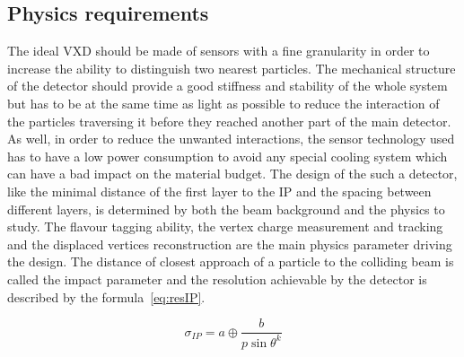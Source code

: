    \subsection{Physics requirements}

   The ideal \gls{VXD} should be made of sensors with a fine granularity in order to increase the ability to distinguish two nearest particles.
   The mechanical structure of the detector should provide a good stiffness and stability of the whole system but has to be at the same time as light as possible to reduce the interaction of the particles traversing it before they reached another part of the main detector.
   As well, in order to reduce the unwanted interactions, the sensor technology used has to have a low power consumption to avoid any special cooling system which can have a bad impact on the material budget.
   The design of the such a detector, like the minimal distance of the first layer to the \gls{IP} and the spacing between different layers, is determined by both the beam background and the physics to study.
   The flavour tagging ability, the vertex charge measurement and tracking and the displaced vertices reconstruction are the main physics parameter driving the design.
   The distance of closest approach of a particle to the colliding beam is called the impact parameter and the resolution achievable by the detector is described by the formula~\ref{eq:resIP}\cite{Battaglia2011}.
    
    \begin{equation}
      \sigma_{IP} = a \oplus \frac{b}{p \sin{\theta}^{k}} 
      \label{eq:resIP}
    \end{equation}
   
